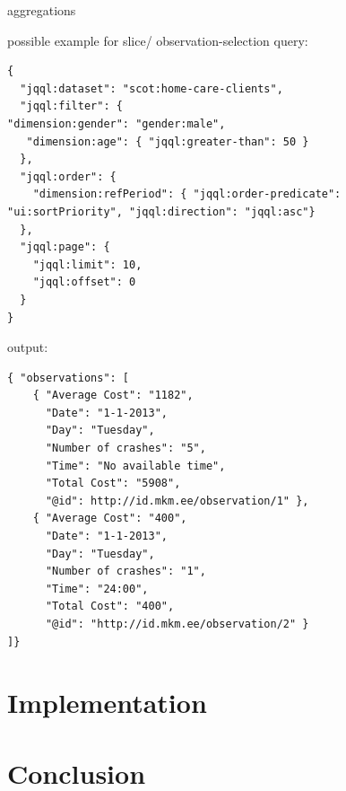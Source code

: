 \documentclass{llncs}
\begin{document}
aggregations


possible example for slice/ observation-selection query:
\begin{verbatim} 
{ 
  "jqql:dataset": "scot:home-care-clients",
  "jqql:filter": {
"dimension:gender": "gender:male",
   "dimension:age": { "jqql:greater-than": 50 }
  },
  "jqql:order": {
    "dimension:refPeriod": { "jqql:order-predicate": "ui:sortPriority", "jqql:direction": "jqql:asc"}
  },
  "jqql:page": {
    "jqql:limit": 10,
    "jqql:offset": 0
  }
}
\end{verbatim}

output:
\begin{verbatim} 
{ "observations": [ 
	{ "Average Cost": "1182", 
   	  "Date": "1-1-2013", 
	  "Day": "Tuesday", 
	  "Number of crashes": "5",
	  "Time": "No available time",
      "Total Cost": "5908", 
	  "@id": http://id.mkm.ee/observation/1" }, 
	{ "Average Cost": "400",
	  "Date": "1-1-2013",
	  "Day": "Tuesday",
	  "Number of crashes": "1",
	  "Time": "24:00",
 	  "Total Cost": "400",
	  "@id": "http://id.mkm.ee/observation/2" }
]}
\end{verbatim}

\section{Implementation}\label{sec:impl}

\section{Conclusion}\label{sec:conclusion}






\end{document}
